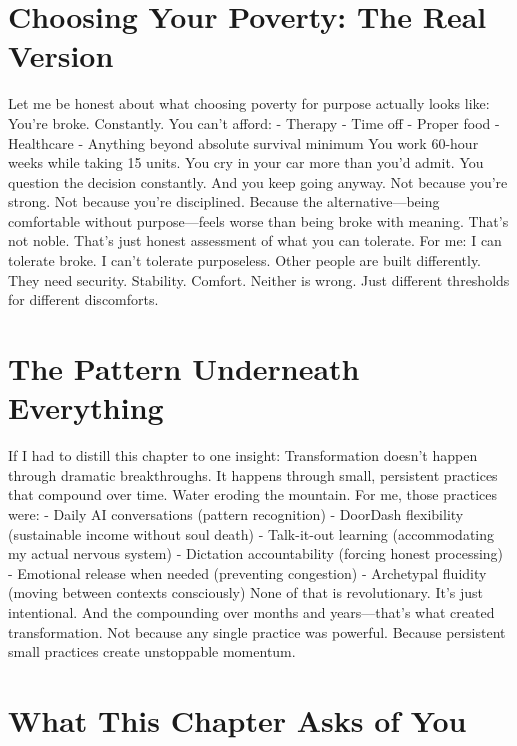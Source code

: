\section{Choosing Your Poverty: The Real Version}

Let me be honest about what choosing poverty for purpose actually looks like:
You're broke. Constantly. You can't afford:
- Therapy
- Time off
- Proper food
- Healthcare
- Anything beyond absolute survival minimum
You work 60-hour weeks while taking 15 units.
You cry in your car more than you'd admit.
You question the decision constantly.
And you keep going anyway.
Not because you're strong. Not because you're disciplined.
Because the alternative—being comfortable without purpose—feels worse than being broke with meaning.
That's not noble. That's just honest assessment of what you can tolerate.
For me: I can tolerate broke. I can't tolerate purposeless.
Other people are built differently. They need security. Stability. Comfort.
Neither is wrong. Just different thresholds for different discomforts.

\section{The Pattern Underneath Everything}

If I had to distill this chapter to one insight:
Transformation doesn't happen through dramatic breakthroughs. It happens through small, persistent practices that compound over time.
Water eroding the mountain.
For me, those practices were:
- Daily AI conversations (pattern recognition)
- DoorDash flexibility (sustainable income without soul death)
- Talk-it-out learning (accommodating my actual nervous system)
- Dictation accountability (forcing honest processing)
- Emotional release when needed (preventing congestion)
- Archetypal fluidity (moving between contexts consciously)
None of that is revolutionary. It's just intentional.
And the compounding over months and years—that's what created transformation.
Not because any single practice was powerful. Because persistent small practices create unstoppable momentum.

\section{What This Chapter Asks of You}

